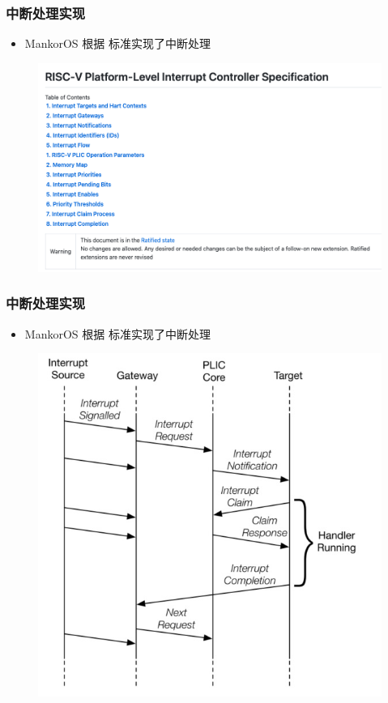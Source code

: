 \begin{frame}
    \frametitle{中断处理实现}

    \begin{itemize}
        \item MankorOS 根据  标准实现了中断处理
    \end{itemize}

    \begin{figure}
        \includegraphics[width=.5\textwidth]{assets/plic.png}
    \end{figure}

\end{frame}

\begin{frame}
    \frametitle{中断处理实现}

    \begin{itemize}
        \item MankorOS 根据  标准实现了中断处理
    \end{itemize}

    \begin{figure}
        \includegraphics[width=.4\textwidth]{assets/plic-flow.jpg}
    \end{figure}

\end{frame}